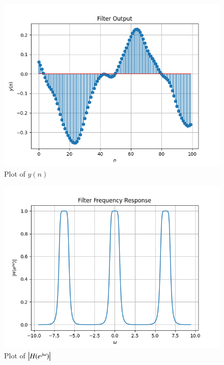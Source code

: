 \documentclass[journal,12pt,twocolumn]{IEEEtran}
\renewcommand\thesection{\arabic{section}}
\begin{document}
\begin{enumerate}[label=\thesection.\arabic*]
	\begin{figure}[!ht]
		\centering
		\includegraphics[width=\columnwidth]{./figs/8_2_1.png}
		\caption{Plot of $y(n)$}
		\label{fig-8.2.1}	
	\end{figure}
	
	\begin{figure}[!ht]
		\centering
		\includegraphics[width=\columnwidth]{./figs/8_2_2.png}
		\caption{Plot of $\left\vert H(e^{j\omega})\right\vert$}
		\label{fig-8.2.2}	
	\end{figure}
	

\end{enumerate}
\end{document}
